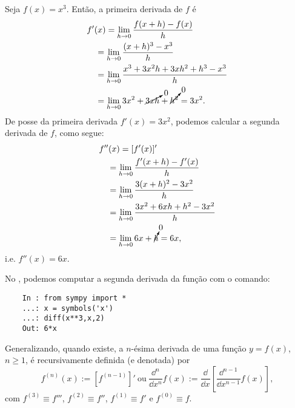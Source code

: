 \begin{ex}\label{ex:deriv_fll}
  Seja $f(x) = x^3$. Então, a primeira derivada de $f$ é
  \begin{align}
    & f'(x) = \lim_{h\to 0} \frac{f(x+h)-f(x)}{h} \\
    & \text{}\quad = \lim_{h\to 0} \frac{(x+h)^3-x^3}{h}\\
    & \text{}\quad = \lim_{h\to 0} \frac{x^3+3x^2h+3xh^2+h^3-x^3}{h}\\
    & \text{}\quad = \lim_{h\to 0} 3x^2+\cancelto{0}{3xh}+\cancelto{0}{h^2} = 3x^2.
  \end{align}
  De posse da primeira derivada $f'(x) = 3x^2$, podemos calcular a segunda derivada de $f$, como segue:
  \begin{align}
    & f''(x) = [f'(x)]' \\
    & \text{}\quad = \lim_{h\to 0} \frac{f'(x+h)-f'(x)}{h} \\
    & \text{}\quad = \lim_{h\to 0} \frac{3(x+h)^2-3x^2}{h} \\
    & \text{}\quad = \lim_{h\to 0} \frac{3x^2+6xh+h^2-3x^2}{h} \\
    & \text{}\quad = \lim_{h\to 0} 6x+\cancelto{0}{h} = 6x,
  \end{align}
  i.e. $f''(x) = 6x$.

  \ifispython
  No \sympy, podemos computar a segunda derivada da função com o comando:
  \begin{lstlisting}
    In : from sympy import *
    ...: x = symbols('x')
    ...: diff(x**3,x,2)
    Out: 6*x
  \end{lstlisting}
  \fi  
\end{ex}

Generalizando, quando existe, a $n$-ésima derivada de uma função $y = f(x)$, $n\geq 1$, é recursivamente definida (e denotada) por
\begin{equation}
  f^{(n)}(x) := [f^{(n-1)}]' ~ \text{ou} ~ \frac{\dd^n}{\dd x^n}f(x) := \frac{\dd}{\dd x}\left[\frac{\dd^{n-1}}{\dd x^{n-1}}f(x)\right],
\end{equation}
com $f^{(3)}\equiv f'''$, $f^{(2)}\equiv f''$, $f^{(1)}\equiv f'$ e $f^{(0)}\equiv f$.

